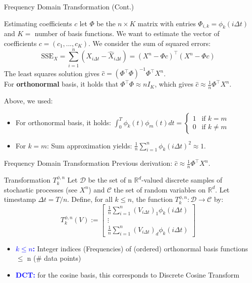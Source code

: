\begin{frame}{Frequency Domain Transformation (Cont.)}
    \begin{block}{Estimating coefficients $c$}
        let $\Phi$ be the $n \times K$ matrix with entries $\Phi_{i,k} = \phi_k(i\Delta t)$ and $K =$ number of basis functions. We want to estimate the vector of coefficients $c = (c_1, ..., c_K)$. We consider the sum of squared errors:
        \begin{equation}
            \text{SSE}_X = \sum_{i=1}^n (X_{i\Delta t} - \hat X_{i\Delta t}) = (X^n - \Phi c)^\top (X^n - \Phi c)
        \end{equation}
        The least squares solution gives $\hat c = (\Phi ^\top \Phi)^{-1}\Phi^\top X^n$. \\
        For \textbf{orthonormal} basis, it holds that $\Phi^\top \Phi \approx nI_K$, which gives $\hat c \approx \frac{1}{n}\Phi^\top X^n$.
    \end{block}
    {\small
    Above, we used:
    \vspace{-0.3cm}
    \begin{itemize}
        \item For orthonormal basis, it holds: $\int_0^T\phi_k(t)\phi_m(t)dt = \begin{cases}1 & \text{if } k=m \\0 & \text{if } k \ne m \end{cases}$
        \item For $k = m$: Sum approximation yields: $\frac{1}{n}\sum_{i=1}^{n}\phi_k(i\Delta t)^2 \approx 1$.
    \end{itemize}
    }
\end{frame}

\begin{frame}{Frequency Domain Transformation}
Previous derivation: $\hat c \approx \frac{1}{n}\Phi^\top X^n$.
    \begin{block}{Transformation $T_k^{\phi,n}$}
        Let $\mathcal{D}$ be the set of n $\mathbb{R}^d$-valued discrete samples of stochastic processes (see $X^n$) and $\mathcal{C}$ the set of random variables on $\mathbb{R}^d$. Let timestamp $\Delta t = T/n$.
        Define, for all $k \le n$, the function $T_k^{\phi,n} : \mathcal{D} \to \mathcal{C}$ by:
        $$T_k^{\phi,n}(V) := \begin{bmatrix} 
        \frac{1}{n} \sum_{i=1}^n (V_{i\Delta t})_1 \phi_k(i\Delta t) \\ 
        \vdots \\ 
        \frac{1}{n} \sum_{i=1}^n (V_{i\Delta t})_d \phi_k(i\Delta t) 
        \end{bmatrix}$$
    \end{block}
    \begin{itemize}
        \item \textbf{\textcolor{blue}{$k \leq n$:}} Integer indices (Frequencies) of (ordered) orthonormal basis functions $\leq$ n (\# data points)
        \item \textbf{\textcolor{blue}{DCT:}} for the cosine basis, this corresponds to Discrete Cosine Transform
    \end{itemize}
\end{frame}

